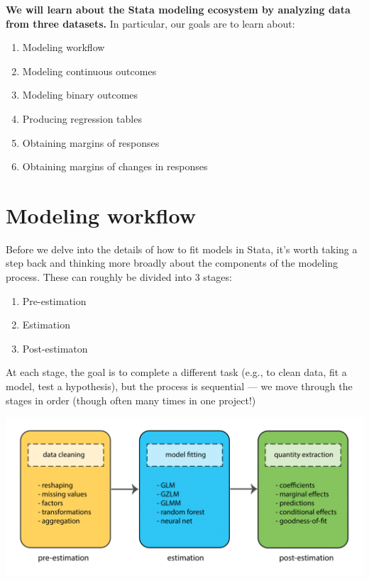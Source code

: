 \documentclass[
]{book}
\providecommand{\tightlist}{%
  \setlength{\itemsep}{0pt}\setlength{\parskip}{0pt}}
\begin{document}
\begin{alert}

\textbf{We will learn about the Stata modeling ecosystem by analyzing data from three datasets.} In particular, our goals are to learn about:

\begin{enumerate}
\def\labelenumi{\arabic{enumi}.}
\tightlist
\item
  Modeling workflow
\item
  Modeling continuous outcomes\\
\item
  Modeling binary outcomes
\item
  Producing regression tables
\item
  Obtaining margins of responses
\item
  Obtaining margins of changes in responses
\end{enumerate}

\end{alert}

\hypertarget{modeling-workflow-1}{%
\section{Modeling workflow}\label{modeling-workflow-1}}

Before we delve into the details of how to fit models in Stata, it's worth taking a step back and thinking more broadly about the components of the modeling process. These can roughly be divided into 3 stages:

\begin{enumerate}
\def\labelenumi{\arabic{enumi}.}
\tightlist
\item
  Pre-estimation
\item
  Estimation
\item
  Post-estimaton
\end{enumerate}

At each stage, the goal is to complete a different task (e.g., to clean data, fit a model, test a hypothesis),
but the process is sequential --- we move through the stages in order (though often many times in one project!)

\includegraphics{Stata/StataModels/images/Stata_model_pipeline.png}
\end{document}
